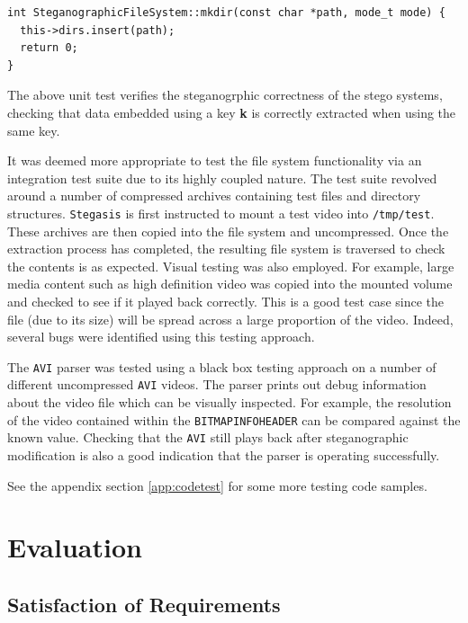 \documentclass[paper=a4, fontsize=11pt,twoside]{scrartcl}
\numberwithin{table}{section}
\numberwithin{figure}{section}
\numberwithin{algorithm}{section}
\begin{document}
\begin{lstlisting}[caption={Embedding algorithm unit test (\texttt{steg/steg\_algorithm\_test.cc:100}).}, frame=single, label=unittest]
int SteganographicFileSystem::mkdir(const char *path, mode_t mode) {
  this->dirs.insert(path);
  return 0;
}
\end{lstlisting}

The above unit test verifies the steganogrphic correctness of the stego systems, checking that data embedded using a key \textbf{k} is correctly extracted when using the same key.

It was deemed more appropriate to test the file system functionality via an integration test suite due to its highly coupled nature. The test suite revolved around a number of compressed archives containing test files and directory structures. \texttt{Stegasis} is first instructed to mount a test video into \texttt{/tmp/test}. These archives are then copied into the file system and uncompressed. Once the extraction process has completed, the resulting file system is traversed to check the contents is as expected. Visual testing was also employed. For example, large media content such as high definition video was copied into the mounted volume and checked to see if it played back correctly. This is a good test case since the file (due to its size) will be spread across a large proportion of the video. Indeed, several bugs were identified using this testing approach.

The \texttt{AVI} parser was tested using a black box testing approach on a number of different uncompressed \texttt{AVI} videos. The parser prints out debug information about the video file which can be visually inspected. For example, the resolution of the video contained within the \texttt{BITMAPINFOHEADER} can be compared against the known value. Checking that the \texttt{AVI} still plays back after steganographic modification is also a good indication that the parser is operating successfully.

See the appendix section \ref{app:codetest} for some more testing code samples. 

\section{Evaluation}
\subsection{Satisfaction of Requirements}
\end{document}
